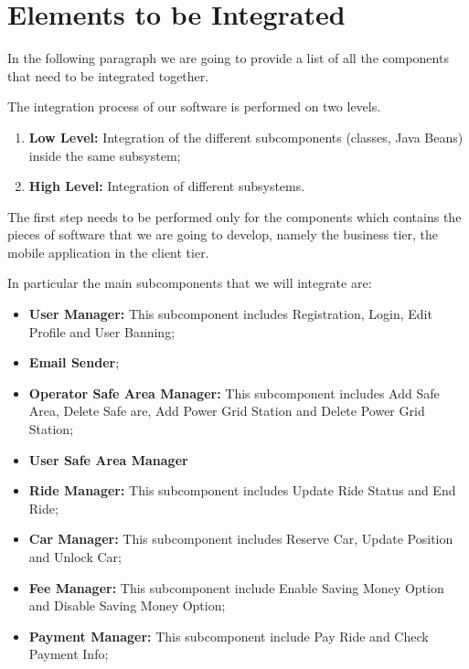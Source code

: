 \section{Elements to be Integrated}
In the following paragraph we are going to provide a list of all the components that need to be integrated together.

The integration process of our software is performed on two levels.
\begin{enumerate}
\item \textbf{Low Level:} Integration of the different subcomponents (classes, Java Beans) inside the
same subsystem;
\item \textbf{High Level:} Integration of different subsystems.
\end{enumerate}

The first step needs to be performed only for the components which contains
the pieces of software that we are going to develop, namely the business
tier, the mobile application in the client tier.

In particular the main subcomponents that we will integrate are:
\begin{itemize}
\item \textbf{User Manager:} This subcomponent includes Registration, Login, Edit Profile and User Banning;
\item \textbf{Email Sender};
\item \textbf{Operator Safe Area Manager:} This subcomponent includes Add Safe Area, Delete Safe are, Add Power Grid Station and Delete Power Grid Station;
\item \textbf{User Safe Area Manager}
\item \textbf{Ride Manager:} This subcomponent includes Update Ride Status and End Ride;
\item \textbf{Car Manager:} This subcomponent includes Reserve Car, Update Position and Unlock Car;
\item \textbf{Fee Manager:} This subcomponent include Enable Saving Money Option and Disable Saving Money Option;
\item \textbf{Payment Manager:} This subcomponent include Pay Ride and Check Payment Info;
\end{itemize}



